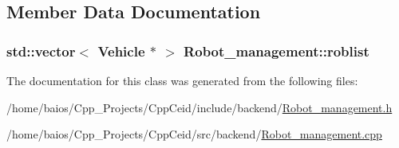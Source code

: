 \subsection{Member Data Documentation}
\hypertarget{class_robot__management_ac309bb3cf06c0a84b058bc1f0459de39}{
\subsubsection[{roblist}]{\setlength{\rightskip}{0pt plus 5cm}std\-::vector$<$ {\bf Vehicle} $\ast$ $>$ Robot\-\_\-management\-::roblist\hspace{0.3cm}{\ttfamily [static]}}}\label{class_robot__management_ac309bb3cf06c0a84b058bc1f0459de39}


The documentation for this class was generated from the following files\-:\begin{DoxyCompactItemize}
\item 
/home/baios/\-Cpp\-\_\-\-Projects/\-Cpp\-Ceid/include/backend/\hyperlink{_robot__management_8h}{Robot\-\_\-management.\-h}\item 
/home/baios/\-Cpp\-\_\-\-Projects/\-Cpp\-Ceid/src/backend/\hyperlink{_robot__management_8cpp}{Robot\-\_\-management.\-cpp}\end{DoxyCompactItemize}
